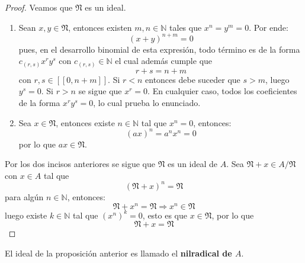 \documentclass[12pt]{report}
\newcounter{it}
\theoremstyle{largebreak}
\newcommand\natint[1]{\ensuremath{\left[\!\left[ #1\right]\!\right]}}
\begin{document}
    \begin{proof}
        Veamos que $\mathfrak{N}$ es un ideal.
        \begin{enumerate}[label = \textit{(\arabic*)}]
            \item Sean $x,y\in\mathfrak{N}$, entonces existen $m,n\in\mathbb{N}$ tales que $x^n=y^m=0$. Por ende:
            \begin{equation*}
                (x+y)^{ n+m}=0
            \end{equation*}
            pues, en el desarrollo binomial de esta expresión, todo término es de la forma $c_{(r,s)}x^ry^s$ con $c_{(r,s)}\in\mathbb{N}$ el cual además cumple que
            \begin{equation*}
                r+s=n+m
            \end{equation*}
            con $r,s\in\natint{0,n+m}$. Si $r<n$ entonces debe suceder que $s>m$, luego $y^s=0$. Si $r>n$ se sigue que $x^r=0$. En cualquier caso, todos los coeficientes de la forma $x^ry^s=0$, lo cual prueba lo enunciado.
            \item Sea $x\in\mathfrak{N}$, entonces existe $n\in\mathbb{N}$ tal que $x^n=0$, entonces:
            \begin{equation*}
                (ax)^n=a^nx^n=0
            \end{equation*}
            por lo que $ax\in\mathfrak{N}$.
        \end{enumerate}
        Por los dos incisos anteriores se sigue que $\mathfrak{N}$ es un ideal de $A$. Sea $\mathfrak{N}+x\in A/\mathfrak{N}$ con $x\in A$ tal que
        \begin{equation*}
            (\mathfrak{N}+x)^n=\mathfrak{N}
        \end{equation*}
        para algún $n\in\mathbb{N}$, entonces:
        \begin{equation*}
            \mathfrak{N}+x^n=\mathfrak{N}\Rightarrow x^n\in\mathfrak{N}
        \end{equation*}
        luego existe $k\in\mathbb{N}$ tal que $(x^n)^k=0$, esto es que $x\in\mathfrak{N}$, por lo que
        \begin{equation*}
            \mathfrak{N}+x=\mathfrak{N}
        \end{equation*}
    \end{proof}

    \begin{mydef}
        El ideal de la proposición anterior es llamado el \textbf{nilradical de $A$}.
    \end{mydef}
\end{document}
